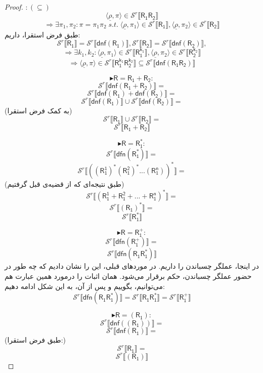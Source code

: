 \begin{proof}
	$:(\subseteq)$
	$$\langle \underline{\rho} ,\pi \rangle \in \mathcal{S}^r \llbracket \mathsf{R_1 R_2} \rrbracket$$
	$$\Rightarrow\exists \pi_1, \pi_2: \pi = \pi_1 \pi_2\;s.t.\;
	\langle \underline{\rho} , \pi_1 \rangle \in \mathcal{S}^r \llbracket \mathsf{R_1} \rrbracket
	,\langle \underline{\rho} , \pi_2 \rangle \in \mathcal{S}^r \llbracket \mathsf{R_2} \rrbracket$$
	طبق فرض استقرا، داریم:
	$$\mathcal{S}^r \llbracket \mathsf{R_1} \rrbracket=
	\mathcal{S}^r \llbracket \mathsf{dnf(R_1)} \rrbracket,
	\mathcal{S}^r \llbracket \mathsf{R_2} \rrbracket=
	\mathcal{S}^r \llbracket \mathsf{dnf(R_2)} \rrbracket,
	$$
	$$\Rightarrow
	\exists k_1,k_2: \langle \underline{\rho} , \pi_1 \rangle \in 
	\mathcal{S}^r \llbracket \mathsf{R_1^{k_1}} \rrbracket,
	\langle \underline{\rho} , \pi_2 \rangle \in 
	\mathcal{S}^r \llbracket \mathsf{R_2^{k_2}} \rrbracket$$
	$$\Rightarrow
	\langle \underline{\rho} , \pi \rangle \in
	\mathcal{S}^r \llbracket \mathsf{R_1^{k_1} R_2^{k_2}} \rrbracket
	\subseteq \mathcal{S}^r \llbracket \mathsf{dnf(R_1 R_2)} \rrbracket
	$$ 
	
	
	$$\blacktriangleright \mathsf{R=R_1 + R_2:}$$	
	$$\mathcal{S}^r \llbracket \mathsf{dnf(R_1+R_2)} \rrbracket=$$
	$$\mathcal{S}^r \llbracket \mathsf{dnf(R_1)+dnf(R_2)} \rrbracket=$$
	$$\mathcal{S}^r \llbracket \mathsf{dnf(R_1)} \rrbracket \cup
	\mathcal{S}^r \llbracket \mathsf{dnf(R_2)} \rrbracket=$$
	(به کمک فرض استقرا)
	$$\mathcal{S}^r \llbracket \mathsf{R_1} \rrbracket \cup
	\mathcal{S}^r \llbracket \mathsf{R_2} \rrbracket=$$
	$$\mathcal{S}^r \llbracket \mathsf{R_1+R_2} \rrbracket$$
	
	$$\blacktriangleright \mathsf{R=R_1^*:}$$
	$$\mathcal{S}^r \llbracket \mathsf{dfn(R_1^*)} \rrbracket=$$
	$$\mathcal{S}^r \llbracket \mathsf{((R_1^1)^* (R_1^2)^* ... (R_1^n))^*} \rrbracket=$$
	(طبق نتیجه‌ای که از قضیه‌ی قبل گرفتیم)
	$$\mathcal{S}^r \llbracket \mathsf{(R_1^1+R_1^2+...+R_1^n)^*} \rrbracket=$$
	$$\mathcal{S}^r \llbracket \mathsf{(R_1)^*} \rrbracket=$$
	$$\mathcal{S}^r \llbracket \mathsf{R_1^*} \rrbracket$$
	
	$$\blacktriangleright \mathsf{R=R_1^+:}$$
	$$\mathcal{S}^r \llbracket \mathsf{dfn(R_1^+)} \rrbracket=$$
	$$\mathcal{S}^r \llbracket \mathsf{dfn(R_1 R_1^*)} \rrbracket$$
	در اینجا، عملگر چسباندن را داریم. در موردهای قبلی، این را نشان دادیم که چه‌ طور در حضور عملگر چسباندن، حکم برقرار می‌شود. همان اثبات را درمورد همین عبارت هم می‌توانیم، بگوییم و پس از آن، به این شکل ادامه دهیم:
	$$\mathcal{S}^r \llbracket \mathsf{dfn(R_1 R_1^*)} \rrbracket=
	\mathcal{S}^r \llbracket \mathsf{R_1 R_1^*} \rrbracket=
	\mathcal{S}^r \llbracket \mathsf{R_1^+} \rrbracket$$
	
	$$\blacktriangleright \mathsf{R=(R_1):}$$
	$$\mathcal{S}^r \llbracket \mathsf{dnf((R_1))} \rrbracket=$$
	$$\mathcal{S}^r \llbracket \mathsf{dnf(R_1)} \rrbracket=$$
	(طبق فرض استقرا:)
	$$\mathcal{S}^r \llbracket \mathsf{R_1} \rrbracket=$$
	$$\mathcal{S}^r \llbracket \mathsf{(R_1)} \rrbracket$$
\end{proof}


